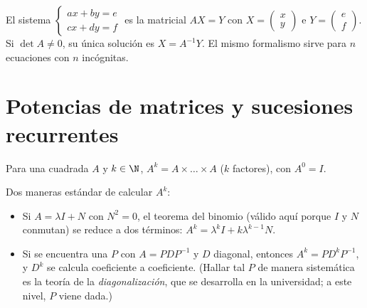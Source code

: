 \begin{method}\label{met:g12:matrix:systems}
El sistema
$\begin{cases} ax + by = e\\ cx + dy = f \end{cases}$
es la  matricial $AX = Y$ con
$X = \begin{pmatrix} x \\ y\end{pmatrix}$ e
$Y = \begin{pmatrix} e \\ f\end{pmatrix}$. Si $\det A \neq 0$, su única
solución es $X = A^{-1}Y$. El mismo formalismo sirve para $n$ ecuaciones
con $n$ incógnitas.
\end{method}

\section{Potencias de matrices y sucesiones recurrentes}

\begin{definition}\label{def:g12:matrix:power}
Para una  cuadrada $A$ y $k \in \N$, $A^k = A \times \dots \times A$
($k$ factores), con $A^0 = I$.
\end{definition}

\begin{method}\label{met:g12:matrix:powers}
Dos maneras estándar de calcular $A^k$:
\begin{itemize}
  \item Si $A = \lambda I + N$ con $N^2 = 0$, el teorema del binomio
        (válido aquí porque $I$ y $N$ conmutan) se reduce a dos términos:
        $A^k = \lambda^k I + k \lambda^{k-1} N$.
  \item Si se encuentra una   $P$ con $A = PDP^{-1}$ y $D$
        diagonal, entonces $A^k = P D^k P^{-1}$, y $D^k$ se calcula
        coeficiente a coeficiente. (Hallar tal $P$ de manera sistemática es
        la teoría de la \emph{diagonalización}, que se desarrolla en la
        universidad; a este nivel, $P$ viene dada.)
\end{itemize}
\end{method}

